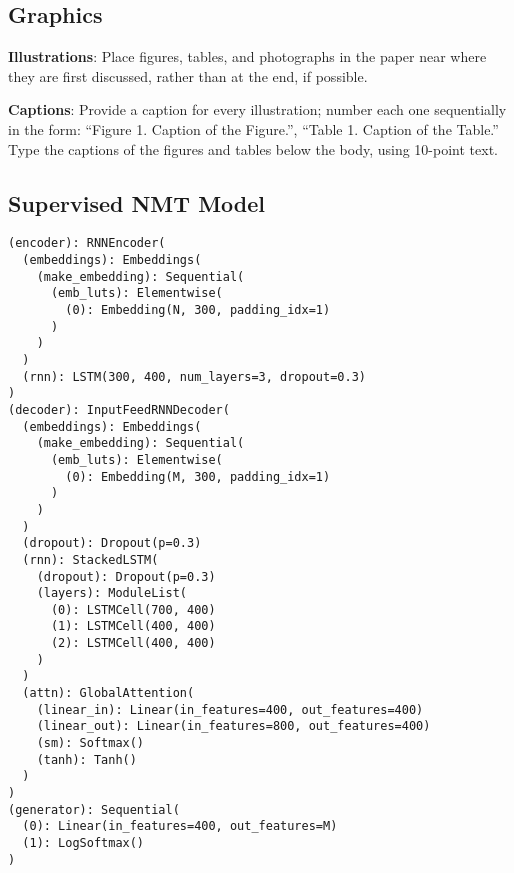 \documentclass[]{article}
\begin{document}
\subsection{Graphics}

{\bf Illustrations}: Place figures, tables, and photo\-graphs in the
paper near where they are first discussed, rather than at the end, if
possible.

{\bf Captions}: Provide a caption for every illustration; number
each one sequentially in the form:  ``Figure 1. Caption of the
Figure.'', ``Table 1. Caption of the Table.''  Type the captions of
the figures and tables below the body, using 10-point text.

\small




\begin{appendices}
\section{Supervised NMT Model}
\label{appendix:supervised}
\begin{lstlisting}
(encoder): RNNEncoder(
  (embeddings): Embeddings(
    (make_embedding): Sequential(
      (emb_luts): Elementwise(
        (0): Embedding(N, 300, padding_idx=1)
      )
    )
  )
  (rnn): LSTM(300, 400, num_layers=3, dropout=0.3)
)
(decoder): InputFeedRNNDecoder(
  (embeddings): Embeddings(
    (make_embedding): Sequential(
      (emb_luts): Elementwise(
        (0): Embedding(M, 300, padding_idx=1)
      )
    )
  )
  (dropout): Dropout(p=0.3)
  (rnn): StackedLSTM(
    (dropout): Dropout(p=0.3)
    (layers): ModuleList(
      (0): LSTMCell(700, 400)
      (1): LSTMCell(400, 400)
      (2): LSTMCell(400, 400)
    )
  )
  (attn): GlobalAttention(
    (linear_in): Linear(in_features=400, out_features=400)
    (linear_out): Linear(in_features=800, out_features=400)
    (sm): Softmax()
    (tanh): Tanh()
  )
)
(generator): Sequential(
  (0): Linear(in_features=400, out_features=M)
  (1): LogSoftmax()
)
\end{lstlisting}
\end{appendices}
\end{document}
